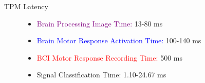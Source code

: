 \begin{frame}{TPM \textemdash{} Latency}
\begin{figure}[!htbp]
{
        }
        \begin{itemize}
            \item \textcolor{purple}{Brain Processing Image Time:} 13-80 ms
            \item \textcolor{blue}{Brain Motor Response Activation Time:} 100-140 ms
            \item \textcolor{red}{BCI Motor Response Recording Time:} 500 ms
            \item \textcolor{amethyst}{Signal Classification Time:} 1.10-24.67 ms
        \end{itemize}
    \end{figure}
\end{frame}
